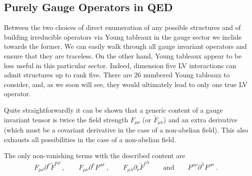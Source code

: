 \documentclass[12pt]{revtex4}
\begin{document}
\subsection{Purely Gauge Operators in QED}

	Between the two choices of direct enumeration of any possible structures
	and of building irreducible operators via Young tableaux in the gauge sector 
	we inclide towards the former.
	We can easily walk through all gauge invariant operators and ensure that
	they are traceless.
	On the other hand, Young tableaux appear to be less useful in this particular
	sector.
	Indeed, dimension five LV interactions can admit structures up to rank five.
	There are 26 numbered Young tableaux to consider, and, as we soon will see,
	they would ultimately lead to only one true LV operator.

	Quite straightforwardly it can be shown that a generic content of a gauge
	invariant tensor is twice the field strength  $ F_{\mu\nu} $ (or 
	$ \widetilde{F}_{\mu\nu} $) and an extra derivative 
	(which must be a covariant derivative in the case of a non-abelian field).
	This also exhausts all possibilities in the case of a non-abelian
	field.


	The only non-vanishing terms with the described content are
\begin{equation}
\label{generic_gauge}
	F_{\mu\nu} \partial^\nu \widetilde{F}^{\mu\rho}~,\qquad
	F_{\mu\nu} \partial^\nu F^{\rho\sigma}~,\qquad
	F_{\mu\lambda} \partial_\nu \widetilde{F}^{\rho\lambda}\qquad
	\text{and}\qquad
	F^{\mu\nu} \partial^\lambda F^{\rho\sigma}~.
\end{equation}
	
\end{document}
